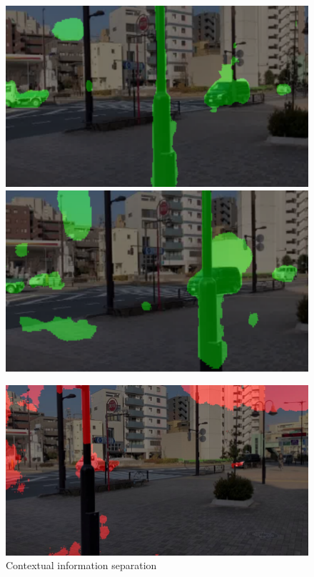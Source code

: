 \documentclass[10pt, twocolumn]{article}
\begin{document}
\begin{figure}[ht]
\begin{minipage}{0.3\linewidth}
    \includegraphics[width=\linewidth]{fig/contextual/frame_00000030.png}
    \includegraphics[width=\linewidth]{fig/contextual/frame_00000040.png}
    \caption*{Contextual information separation}
  \end{minipage}
  \hfil
  \begin{minipage}{0.3\linewidth}
    \includegraphics[width=\linewidth]{fig/proposed/00002.jpg}

\end{minipage}
\end{figure}
\end{document}
